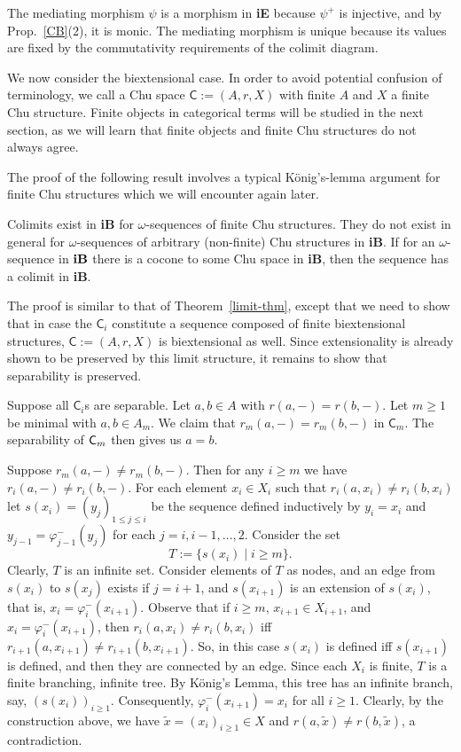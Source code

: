 \documentclass{LMCS}
\let\pf\proof
\let\epf\endproof
\begin{document}
The mediating morphism
$\psi$ is a morphism in {\bf iE} because   $\psi^+$ is injective,
and by Prop.~\ref{CB}(2), it is monic. The mediating morphism
is unique because its values are fixed by the commutativity requirements of the colimit diagram.
\epf

We now consider the biextensional case.
In order to avoid potential confusion of terminology, we call
a Chu space $\mathsf{C}:= (A, r, X)$ with finite $A$ and $X$ a finite Chu structure.
Finite objects in categorical terms will be studied in the next section, as we will
learn that finite objects and finite Chu structures do not always agree.

The proof of the following result involves a typical 
K{\"o}nig's-lemma argument for finite Chu structures which we will encounter
again later.

\begin{thm}\label{limit-thmB}
  Colimits exist in {\bf iB} for $\omega$-sequences of finite Chu structures. 
  They do not exist in general for $\omega$-sequences of arbitrary (non-finite) Chu structures in {\bf iB}.
   If for an
  $\omega$-sequence
in ${\bf iB}$ there is a cocone to some Chu space in {\bf iB}, then
  the sequence has a colimit in {\bf iB}. 
\end{thm}


\pf The proof is similar to that of Theorem~\ref{limit-thm}, except
that we need to show that in case the $\mathsf{C}_i$ constitute a
sequence composed of finite biextensional structures, $\mathsf{C}:= (A,
r, X)$ is biextensional as well.  Since extensionality is already
shown to be preserved by this limit structure, it remains to show that
separability is preserved.

Suppose all $\mathsf{C}_i$s are separable.  Let $a,b \in A$ with $r(a,-)
= r(b,-)$. Let $m \geq 1$ be minimal with $a,b \in A_m$.  We claim
that $r_m(a,-) = r_m(b,-)$ in $\mathsf{C}_m$. The separability of ${\sf
  C}_m$ then gives us $a=b$. 

Suppose $r_m(a,-) \ne r_m(b,-)$. Then for any $i\geq m$ we have
$r_i(a,-) \ne r_i(b,-)$. For each element $x_i\in X_i$ such that
$r_i(a,x_i) \ne r_i(b,x_i)$ let $s(x_i) = (y_j)_{1 \leq j \leq i}$ be
the sequence defined inductively by $y_i=x_i$ and
$y_{j-1}=\varphi_{j-1}^-(y_j)$ for each $j =i , i-1, \ldots ,2$. 
Consider the set
$$T:=\{ s(x_i) \mid i \geq m \}.$$
Clearly, $T$ is an infinite set.  Consider elements of $T$ as nodes,
and an edge from $s (x_i)$ to $s (x_j)$ exists if $j=i+1$, and
$s(x_{i+1})$ is an extension of $s(x_i)$, that is, $x_i =
\varphi_i^-(x_{i+1})$. 
Observe that if $i \geq m$, $x_{i+1} \in X_{i+1}$, and $x_i =
\varphi_i^-(x_{i+1})$, then $r_i(a,x_i) \ne r_i(b,x_i)$ iff
$r_{i+1}(a,x_{i+1}) \ne r_{i+1}(b,x_{i+1})$. So, in this case $s(x_i)$
is defined iff $s(x_{i+1})$ is defined, and then they are connected by
an edge. Since each $X_i$ is finite, $T$ is a finite branching,
infinite tree.  By K\"{o}nig's Lemma, this tree has an infinite
branch, say, $(s(x_i))_{i \geq 1}$.  Consequently, $\varphi_i^-
(x_{i+1}) = x_i$ for all $i\geq 1$.  Clearly, by the construction
above, we have $\tilde{x}=(x_i)_{i\geq 1}\in X$ and $r(a,\tilde{x} )
\ne r(b, \tilde{x})$, a contradiction. 
\end{document}
